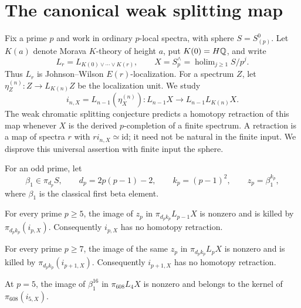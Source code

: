 \section{The canonical weak splitting map}\label{sec:introduction}

Fix a prime $p$ and work in ordinary $p$-local spectra, with sphere
$S=S^0_{(p)}$. Let $K(a)$ denote Morava $K$-theory of height $a$, put
$K(0)=H\mathbb Q$, and write
\[
 L_r=L_{K(0)\vee\cdots\vee K(r)},\qquad
 X=S_p^\wedge=\operatorname{holim}_{j\geq1}S/p^j.
\]
Thus $L_r$ is Johnson--Wilson $E(r)$-localization. For a spectrum $Z$,
let $\eta_Z^{(n)}:Z\to L_{K(n)}Z$ be the localization unit. We study
\begin{equation}\label{eq:weak-unit}
 i_{n,X}=L_{n-1}(\eta_X^{(n)}):
 L_{n-1}X\longrightarrow L_{n-1}L_{K(n)}X.
\end{equation}
The weak chromatic splitting conjecture predicts a homotopy retraction
of this map whenever $X$ is the derived $p$-completion of a finite
spectrum. A retraction is a map of spectra $r$ with
$r i_{n,X}\simeq\mathrm{id}$; it need not be natural in the finite input.
We disprove this universal assertion with finite input the sphere.

For an odd prime, let
\[
 \beta_1\in\pi_{d_p}S,\qquad
 d_p=2p(p-1)-2,\qquad k_p=(p-1)^2,
 \qquad z_p=\beta_1^{k_p},
\]
where $\beta_1$ is the classical first beta element.

\begin{theorem}
\label{thm:height-p-kernel}
For every prime $p\geq5$, the image of $z_p$ in
$\pi_{d_pk_p}L_{p-1}X$ is nonzero and is killed by
$\pi_{d_pk_p}(i_{p,X})$. Consequently $i_{p,X}$ has no homotopy
retraction.
\end{theorem}

\begin{theorem}
\label{thm:height-plus-one-kernel}
For every prime $p\geq7$, the image of the same $z_p$ in
$\pi_{d_pk_p}L_pX$ is nonzero and is killed by
$\pi_{d_pk_p}(i_{p+1,X})$. Consequently $i_{p+1,X}$ has no homotopy
retraction.
\end{theorem}

\begin{corollary}\label{thm:five}
At $p=5$, the image of $\beta_1^{16}$ in $\pi_{608}L_4X$ is nonzero
and belongs to the kernel of $\pi_{608}(i_{5,X})$.
\end{corollary}

